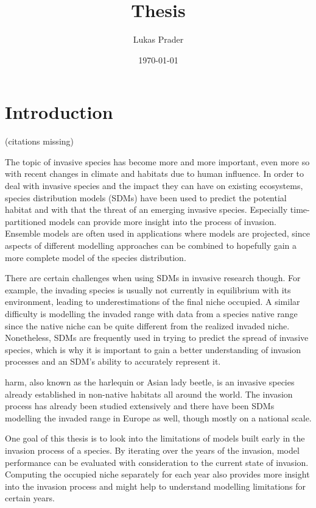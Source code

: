 \documentclass[12pt,a4paper]{article}
\begin{document}
\title{Thesis}
\author{Lukas Prader}
\date{\today}
\maketitle

\newpage
\tableofcontents
\newpage

\section{Introduction}
 (citations missing)

The topic of invasive species has become more and more important, even more so with recent changes in climate and habitats due to human influence.
In order to deal with invasive species and the impact they can have on existing ecosystems, species distribution models (SDMs) have been used to predict the potential habitat and with that the threat of an emerging invasive species.
Especially time-partitioned models can provide more insight into the process of invasion.
Ensemble models are often used in applications where models are projected, since aspects of different modelling approaches can be combined to hopefully gain a more complete model of the species distribution.

There are certain challenges when using SDMs in invasive research though.
For example, the invading species is usually not currently in equilibrium with its environment, leading to underestimations of the final niche occupied.
A similar difficulty is modelling the invaded range with data from a species native range since the native niche can be quite different from the realized invaded niche.
Nonetheless, SDMs are frequently used in trying to predict the spread of invasive species, which is why it is important to gain a better understanding of invasion processes and an SDM's ability to accurately represent it.

\gls{harm}, also known as the harlequin or Asian lady beetle, is an invasive species already established in non-native habitats all around the world.
The invasion process has already been studied extensively and there have been SDMs modelling the invaded range in Europe as well, though mostly on a national scale.

One goal of this thesis is to look into the limitations of models built early in the invasion process of a species.
By iterating over the years of the invasion, model performance can be evaluated with consideration to the current state of invasion.
Computing the occupied niche separately for each year also provides more insight into the invasion process and might help to understand modelling limitations for certain years.
\end{document}
